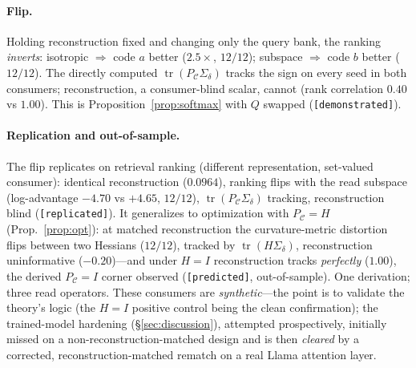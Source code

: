 \documentclass[11pt]{article}
\theoremstyle{definition}
\theoremstyle{remark}
\newcommand{\PC}{P_{\mathcal{C}}}
\newcommand{\Sd}{\Sigma_{\delta}}
\newcommand{\tr}{\operatorname{tr}}
\begin{document}
\paragraph{Flip.} Holding reconstruction fixed and changing only the query bank, the
ranking \emph{inverts}: isotropic $\Rightarrow$ code $a$ better ($2.5\times$,
$12/12$); subspace $\Rightarrow$ code $b$ better ($12/12$). The directly computed
$\tr(\PC\Sd)$ tracks the sign on every seed in both consumers; reconstruction, a
consumer-blind scalar, cannot (rank correlation $0.40$ vs $1.00$). This is
Proposition~\ref{prop:softmax} with $Q$ swapped (\texttt{[demonstrated]}).

\paragraph{Replication and out-of-sample.} The flip replicates on retrieval ranking
(different representation, set-valued consumer): identical reconstruction
($0.0964$), ranking flips with the read subspace (log-advantage $-4.70$ vs $+4.65$,
$12/12$), $\tr(\PC\Sd)$ tracking, reconstruction blind (\texttt{[replicated]}). It
generalizes to optimization with $\PC=H$ (Prop.~\ref{prop:opt}): at matched
reconstruction the curvature-metric distortion flips between two Hessians ($12/12$),
tracked by $\tr(H\Sd)$, reconstruction uninformative ($-0.20$)---and under $H=I$
reconstruction tracks \emph{perfectly} ($1.00$), the derived $\PC=I$ corner observed
(\texttt{[predicted]}, out-of-sample). One derivation; three read operators. These
consumers are \emph{synthetic}---the point is to validate the theory's logic (the
$H=I$ positive control being the clean confirmation); the trained-model hardening
(\S\ref{sec:discussion}), attempted prospectively, initially missed on a
non-reconstruction-matched design and is then \emph{cleared} by a corrected,
reconstruction-matched rematch on a real Llama attention layer.
\end{document}
